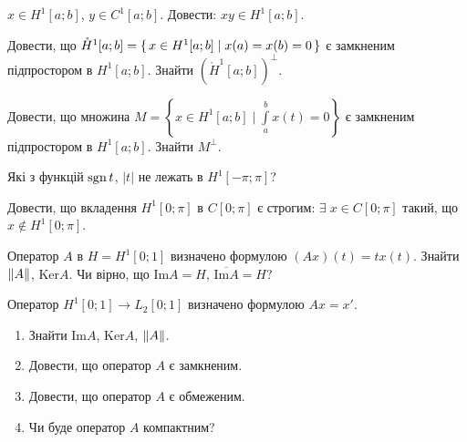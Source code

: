 \begin{exercise}
    $x \in H^1[a;b]$, $y \in C^1[a;b]$. Довести: $xy \in H^1[a;b]$.
\end{exercise}

\begin{exercise}
    Довести, що $\mathring{H}^1[a;b] = \set{x \in H^1[a;b] \mid x(a) = x(b) = 0}$
    є замкненим підпростором в $H^1[a;b]$. Знайти $\left(\mathring{H}^1[a;b]\right)^{\perp}$. 
\end{exercise}

\begin{exercise}
    Довести, що множина $M = \left\{ x \in H^1[a;b] \mid \int\limits_a^b x(t) = 0\right\}$
    є замкненим підпростором в $H^1[a;b]$. Знайти $M^{\perp}$.
\end{exercise}

\begin{exercise}
    Які з функцій $\operatorname{sgn} t$, $|t|$ не лежать в $H^1[-\pi; \pi]$?
\end{exercise}

\begin{exercise}\label{N:3_1_15}
    Довести, що вкладення $H^1[0; \pi]$ в $C[0; \pi]$ є строгим:
    $\exists \; x \in C[0; \pi]$ такий, що $x \notin H^1[0;\pi]$.
\end{exercise}

\begin{exercise}
    Оператор $A$ в $H = H^1[0;1]$ визначено формулою $(Ax)(t) = t x(t)$.
    Знайти $\left\lVert A\right\rVert$, $\mathrm{Ker}{A}$. Чи вірно, що $\mathrm{Im}{A} = H$,
    $\overline{\mathrm{Im}{A}} = H$?
\end{exercise}

\begin{exercise}\label{N:3_1_17}
    Оператор $H^1[0;1] \to L_2[0;1]$ визначено формулою $Ax = x'$.
    \begin{enumerate}
        \item Знайти $\mathrm{Im}{A}$, $\mathrm{Ker}{A}$, $\left\lVert A\right\rVert$.
        \item Довести, що оператор $A$ є замкненим.
        \item Довести, що оператор $A$ є обмеженим.
        \item Чи буде оператор $A$ компактним?
    \end{enumerate}
\end{exercise}